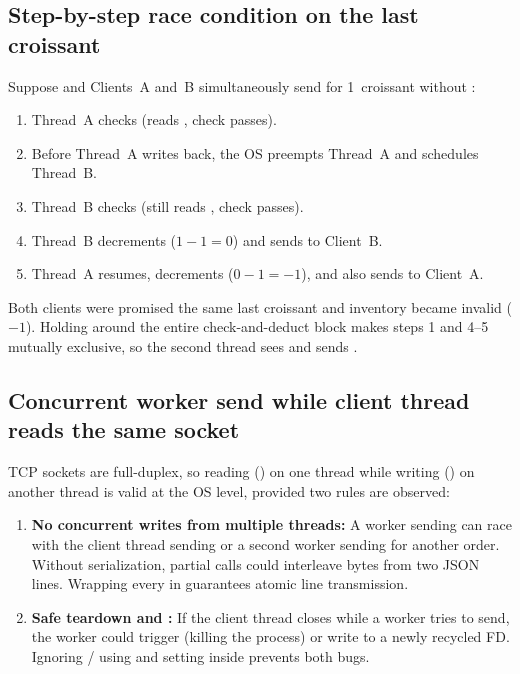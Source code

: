 \documentclass{../latex/utmreport}
\begin{document}
\subsection{Step-by-step race condition on the last croissant}
Suppose  and Clients~A and~B simultaneously send  for 1~croissant without :
\begin{enumerate}
  \item Thread~A checks  (reads , check passes).
  \item Before Thread~A writes back, the OS preempts Thread~A and schedules Thread~B.
  \item Thread~B checks  (still reads , check passes).
  \item Thread~B decrements  ($1 - 1 = 0$) and sends  to Client~B.
  \item Thread~A resumes, decrements  ($0 - 1 = -1$), and also sends  to Client~A.
\end{enumerate}
Both clients were promised the same last croissant and inventory became invalid ($-1$). Holding  around the entire check-and-deduct block makes steps 1 and 4--5 mutually exclusive, so the second thread sees  and sends .

\subsection{Concurrent worker send while client thread reads the same socket}
TCP sockets are full-duplex, so reading () on one thread while writing () on another thread is valid at the OS level, provided two rules are observed:
\begin{enumerate}
  \item \textbf{No concurrent writes from multiple threads:} A worker sending  can race with the client thread sending  or a second worker sending  for another order. Without serialization, partial  calls could interleave bytes from two JSON lines. Wrapping every  in  guarantees atomic line transmission.
  \item \textbf{Safe teardown and :} If the client thread closes  while a worker tries to send, the worker could trigger  (killing the process) or write to a newly recycled FD. Ignoring  / using  and setting  inside  prevents both bugs.
\end{enumerate}
\end{document}
